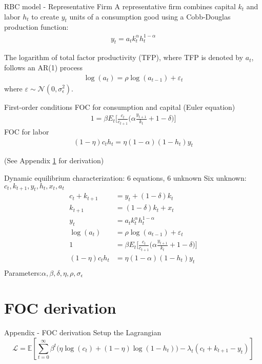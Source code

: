 \documentclass[aspectratio=169]{beamer} %
\begin{document}
\begin{frame}{RBC model - Representative Firm}
    A representative firm combines capital $k_t$ and labor $h_t$ to create $y_t$ units of a consumption good using a Cobb-Douglas production function: 
    \begin{align*}
        y_t = a_t k_t^{\alpha} h_t^{1-\alpha}\tag{3}
    \end{align*}

The logarithm of total factor productivity (TFP), where TFP is denoted by $a_t$, follows an AR(1) process
\begin{align*}
    \log(a_t) = \rho  \log(a_{t-1}) + \varepsilon_t\tag{4}
\end{align*}
where $\varepsilon\sim\mathcal{N}(0,\sigma_\epsilon^2)$.
\end{frame}
\begin{frame}{First-order conditions}
FOC for consumption and capital (Euler equation)
\begin{align*}
    1 = \beta E_t \Big[ \frac{c_t}{c_{t+1}}\big(\alpha \frac{y_{t+1}}{k_t} + 1 -\delta \big) \Big]\tag{5}
\end{align*}
FOC for labor
\begin{align*}
    (1-\eta) c_t h_t = \eta(1- \alpha)(1 - h_t) y_t \tag{6}
\end{align*}

(See Appendix \ref{app:foc} for derivation)
\end{frame}

\begin{frame}{Dynamic equilibrium characterization: 6 equations, 6 unknown}
Six unknown: $c_t, k_{t+1}, y_t, h_t, x_t, a_t$
\begin{align*}
     c_t + k_{t+1} &= y_t + (1 - \delta)k_{t}\tag{Budget Constr.}\\
    k_{t+1} &= (1-\delta)k_t + x_t\tag{Capital LoM}\\
     y_t &= a_t k_t^{\alpha} h_t^{1-\alpha}\tag{Production}\\
     \log(a_t) &= \rho  \log(a_{t-1}) + \varepsilon_t\tag{Exog. TFP}\\
     1 &= \beta E_t \Big[ \frac{c_t}{c_{t+1}}\big(\alpha \frac{y_{t+1}}{k_t} + 1 -\delta \big) \Big]\tag{Euler eq.}\\
     (1-\eta) c_t h_t &= \eta(1- \alpha)(1 - h_t) y_t \tag{Labor foc}\\
\end{align*}
Parameters:$\alpha, \beta, \delta, \eta, \rho,\sigma_\epsilon$
\end{frame}

\section{FOC derivation}\label{app:foc}
\begin{frame}{Appendix - FOC derivation}
    Setup the Lagrangian
    $$
    \mathscr{L} = \mathbb{E}\left[ \sum_{t=0}^\infty\beta^t \Big(\eta \log(c_t) + (1-\eta)\log(1 - h_t) \Big) - \lambda_t\left(c_t+k_{t+1}-y_t\right) \right]
    $$
\end{frame}
\end{document}
